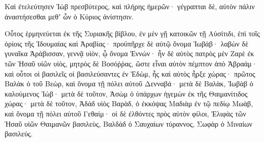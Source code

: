 {Καὶ ἐτελεύτησεν Ἰὼβ πρεσβύτερος, καὶ πλήρης ἡμερῶν·
γέγραπται δὲ, αὐτὸν πάλιν ἀναστήσεσθαι μεθʼ ὧν ὁ Κύριος ἀνίστησιν.
\par }{\PP {}Οὗτος ἑρμηνεύεται ἐκ τῆς Συριακῆς βίβλου, ἐν μὲν γῇ κατοικῶν τῇ Αὐσίτιδι, ἐπὶ τοῖς ὁρίοις τῆς Ἰδουμαίας καὶ Ἀραβίας· προϋπῆρχε δὲ αὐτῷ ὄνομα Ἰωβάβ·
λαβὼν δὲ γυναῖκα Ἀράβισσαν, γεννᾷ υἱὸν, ᾧ ὄνομα Ἐννών· ἦν δὲ αὐτὸς πατρὸς μὲν Ζαρὲ ἐκ τῶν Ἡσαῦ υἱῶν υἱὸς, μητρὸς δὲ Βοσόῤῥας, ὥστε εἶναι αὐτὸν πέμπτον ἀπὸ Ἁβραάμ·
καὶ οὗτοι οἱ βασιλεῖς οἱ βασιλεύσαντες ἐν Ἐδὼμ, ἧς καὶ αὐτὸς ἦρξε χώρας· πρῶτος Βαλὰκ ὁ τοῦ Βεὼρ, καὶ ὄνομα τῇ πόλει αὐτοῦ Δενναβά· μετὰ δὲ Βαλὰκ, Ἰωβὰβ ὁ καλούμενος Ἰώβ· μετὰ δὲ τοῦτον, Ἀσὼμ ὁ ὑπάρχων ἡγεμὼν ἐκ τῆς Θαιμανίτιδος χώρας· μετὰ δὲ τοῦτον, Ἀδὰδ υἱὸς Βαρὰδ, ὁ ἐκκόψας Μαδιὰμ ἐν τῷ πεδίῳ Μωὰβ, καὶ ὄνομα τῇ πόλει αὐτοῦ Γεθαίμ·
οἱ δὲ ἐλθόντες πρὸς αὐτὸν φίλοι, Ἐλιφὰς τῶν Ἡσαῦ υἱῶν Θαιμανῶν βασιλεὺς, Βαλδὰδ ὁ Σαυχαίων τύραννος, Σωφὰρ ὁ Μιναίων βασιλεύς.
\par }